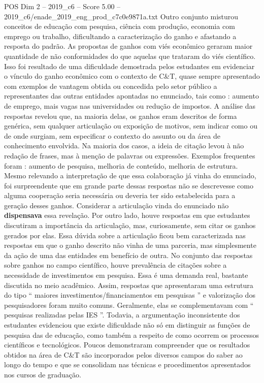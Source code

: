 \begin{textsample}{POS Dim 2 – 2019\_c6 – Score 5.00 – 2019\_c6/enade\_2019\_eng\_prod\_c7c0e9871a.txt}
Outro conjunto misturou conceitos de educação com pesquisa, ciência com produção, economia com emprego ou trabalho, dificultando a caracterização do ganho e afastando a resposta do padrão.
As propostas de ganhos com viés econômico geraram maior quantidade de não conformidades do que aquelas que trataram do viés científico.
Isso foi resultado de uma dificuldade demostrada pelos estudantes em evidenciar o vínculo do ganho econômico com o contexto de C\&T, quase sempre apresentado com exemplos de vantagem obtida ou concedida pelo setor público a representantes das outras entidades apontadas no enunciado, tais como : aumento de emprego, mais vagas nas universidades ou redução de impostos.
A análise das respostas revelou que, na maioria delas, os ganhos eram descritos de forma genérica, sem qualquer articulação ou exposição de motivos, sem indicar como ou de onde surgiam, sem especificar o contexto do assunto ou da área de conhecimento envolvida.
Na maioria dos casos, a ideia de citação levou à não redação de frases, mas à menção de palavras ou expressões.
Exemplos frequentes foram : aumento de pesquisa, melhoria de conteúdo, melhoria de estrutura.
Mesmo relevando a interpretação de que essa colaboração já vinha do enunciado, foi surpreendente que em grande parte dessas respostas não se descrevesse como alguma cooperação seria necessária ou deveria ter sido estabelecida para a geração desses ganhos.
Considerar a articulação vinda do enunciado não \textbf{dispensava} essa revelação.
Por outro lado, houve respostas em que estudantes discutiram a importância da articulação, mas, curiosamente, sem citar os ganhos gerados por elas.
Essa dúvida sobre a articulação ficou bem caracterizada nas respostas em que o ganho descrito não vinha de uma parceria, mas simplesmente da ação de uma das entidades em benefício de outra.
No conjunto das respostas sobre ganhos no campo científico, houve prevalência de citações sobre a necessidade de investimentos em pesquisa.
Essa é uma demanda real, bastante discutida no meio acadêmico.
Assim, respostas que apresentaram uma estrutura do tipo “ maiores investimentos/financiamentos em pesquisas ” e valorização dos pesquisadores foram muito comuns.
Geralmente, elas se complementavam com “ pesquisas realizadas pelas IES ”.
Todavia, a argumentação inconsistente dos estudantes evidenciou que existe dificuldade não só em distinguir as funções de pesquisa das de educação, como também a respeito de como ocorrem os processos científicos e tecnológicos.
Poucos demonstraram compreender que os resultados obtidos na área de C\&T são incorporados pelos diversos campos do saber ao longo do tempo e que se consolidam nas técnicas e procedimentos apresentados nos cursos de graduação.

\end{textsample}
